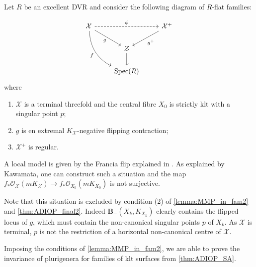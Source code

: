 \documentclass[a4paper,12pt]{book}
\DeclareMathOperator{\Spec}{Spec}
\begin{document}
	\begin{example}	\label{ex-kawamata}
		Let $R$ be an excellent DVR and consider the following diagram of $R$-flat families:
		
		\[\begin{tikzcd}
			\mathcal{X} \ar[rr, dashed, "\phi"] \arrow[rd, "g",swap] \ar[rdd, bend right,
			"f",swap] &   & \mathcal{X}^{+}  \arrow[ld, "g^+"]  \\
			&  \mathcal{Z}    \ar[d]                             & 	\\
			& \Spec(R) &
		\end{tikzcd}
		\] 
		where
		\begin{enumerate}
			\item $\mathcal{X}$ is a terminal threefold and the central fibre  $X_0$ is strictly klt with a singular point $p$;
			\item $g$ is en extremal $K_{\mathcal{X}}$-negative flipping contraction;
			\item $\mathcal{X}^{+}$ is regular.
		\end{enumerate}
		A local model is given by the Francia flip explained in \cite{Kaw99}. 
		As explained by Kawamata, one can construct such a situation and the map
		$f_*\mathcal{O}_{\mathcal{X}}(mK_{\mathcal{X}}) \to f_* \mathcal{O}_{X_0}(mK_{X_0})$ is not surjective.
		
		
		Note that this situation is excluded by condition (2) of \autoref{lemma:MMP_in_fam2} and \autoref{thm:ADIOP_final2}.
		Indeed $\textbf{B}_{-}(X_k, K_{X_k})$ clearly contains the flipped locus of $g$, which must contain the non-canonical singular points $p$ of $X_k$. As $\mathcal{X}$ is terminal, $p$ is not the restriction of a horizontal non-canonical centre of $\mathcal{X}$.
	\end{example}
	

Imposing the conditions of \autoref{lemma:MMP_in_fam2}, we are able to prove the invariance of plurigenera for families of klt surfaces from \autoref{thm:ADIOP_SA}.
	
\end{document}
